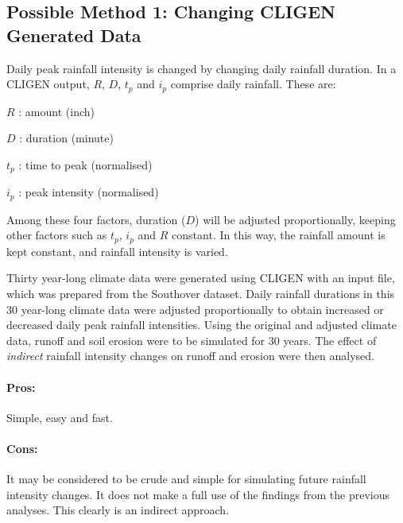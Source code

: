 
\subsection{Possible Method 1: Changing CLIGEN Generated Data}
\label{sec:MethodOne}

Daily peak rainfall intensity is changed by changing daily rainfall duration.
In a CLIGEN output, $R$, $D$, $t_p$ and $i_p$ comprise daily rainfall. These
are:
\begin{itemize*}
  \item $R$ : amount (inch)
  \item $D$ : duration (minute)
  \item $t_p$ : time to peak (normalised)
  \item $i_p$ : peak intensity (normalised)
\end{itemize*}
Among these four factors, duration ($D$) will be adjusted proportionally,
keeping other factors such as $t_p$, $i_p$ and $R$ constant. In this way, the
rainfall amount is kept constant, and rainfall intensity is varied.

Thirty year-long climate data were generated using CLIGEN with an input file,
which was prepared from the Southover dataset. Daily rainfall durations in this
30 year-long climate data were adjusted proportionally to obtain increased or
decreased daily peak rainfall intensities. Using the original and adjusted
climate data, runoff and soil erosion were to be simulated for 30 years. The
effect of \textit{indirect} rainfall intensity changes on runoff and erosion
were then analysed.

\paragraph{Pros:}
\label{sec:ProsMethodOne}
Simple, easy and fast.
\paragraph{Cons:}
\label{sec:ConsMethodOne}
It may be considered to be crude and simple for simulating future rainfall
intensity changes. It does not make a full use of the findings from the previous
analyses. This clearly is an indirect approach.

